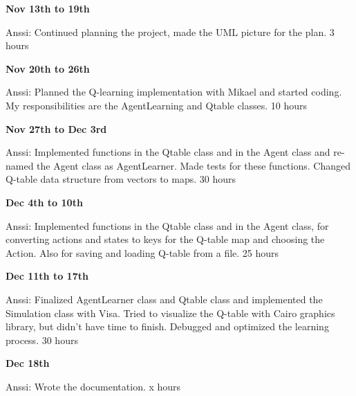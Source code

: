 \documentclass{article}
\begin{document}
\textbf{Nov 13th to 19th}

Anssi:
Continued planning the project, made the UML picture for the plan.
3 hours

\textbf{Nov 20th to 26th}

Anssi:
Planned the Q-learning implementation with Mikael and started coding.
My responsibilities are the AgentLearning and Qtable classes.
10 hours

\textbf{Nov 27th to Dec 3rd}

Anssi:
Implemented functions in the Qtable class and in the Agent class and
re-named the Agent class as AgentLearner. Made tests for these functions.
Changed Q-table data structure from vectors to maps.
30 hours

\textbf{Dec 4th to 10th}

Anssi:
Implemented functions in the Qtable class and in the Agent class, for
converting actions and states to keys for the Q-table map and choosing
the Action. Also for saving and loading Q-table from a file.
25 hours

\textbf{Dec 11th to 17th}

Anssi:
Finalized AgentLearner class and Qtable class and implemented the
Simulation class with Visa. Tried to visualize the Q-table with
Cairo graphics library, but didn’t have time to finish. Debugged
and optimized  the learning process.
30 hours

\textbf{Dec 18th}

Anssi:
Wrote the documentation.
x hours
\end{document}
